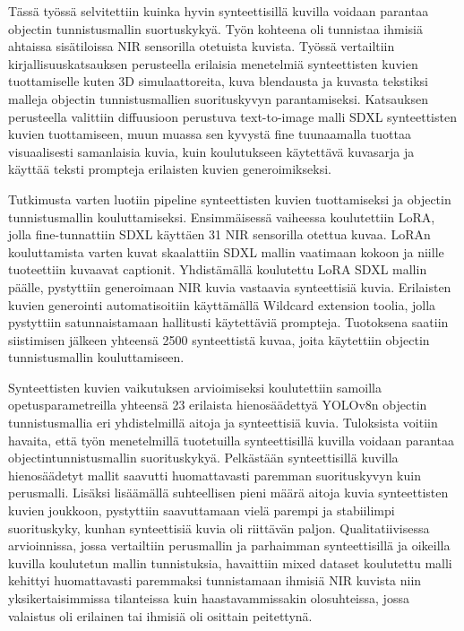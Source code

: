 Tässä työssä selvitettiin kuinka hyvin synteettisillä kuvilla voidaan parantaa objectin tunnistusmallin suortuskykyä. Työn kohteena oli tunnistaa ihmisiä ahtaissa sisätiloissa NIR sensorilla otetuista kuvista. Työssä vertailtiin kirjallisuuskatsauksen perusteella erilaisia menetelmiä synteettisten kuvien tuottamiselle kuten 3D simulaattoreita, kuva blendausta ja kuvasta tekstiksi malleja objectin tunnistusmallien suorituskyvyn parantamiseksi. Katsauksen perusteella valittiin diffuusioon perustuva text-to-image malli SDXL synteettisten kuvien tuottamiseen, muun muassa sen kyvystä fine tuunaamalla tuottaa visuaalisesti samanlaisia kuvia, kuin koulutukseen käytettävä kuvasarja ja käyttää teksti prompteja erilaisten kuvien generoimikseksi. 


Tutkimusta varten luotiin pipeline synteettisten kuvien tuottamiseksi ja objectin tunnistusmallin kouluttamiseksi. Ensimmäisessä vaiheessa koulutettiin LoRA, jolla fine-tunnattiin SDXL käyttäen 31 NIR sensorilla otettua kuvaa. LoRAn kouluttamista varten kuvat skaalattiin SDXL mallin vaatimaan kokoon ja niille tuoteettiin kuvaavat captionit.  Yhdistämällä koulutettu LoRA SDXL mallin päälle, pystyttiin generoimaan NIR kuvia vastaavia synteettisiä kuvia. Erilaisten kuvien generointi automatisoitiin käyttämällä Wildcard extension toolia, jolla pystyttiin satunnaistamaan hallitusti käytettäviä prompteja. Tuotoksena saatiin siistimisen jälkeen yhteensä 2500 synteettistä kuvaa, joita käytettiin objectin tunnistusmallin kouluttamiseen.

Synteettisten kuvien vaikutuksen arvioimiseksi koulutettiin samoilla opetusparametreilla yhteensä 23 erilaista hienosäädettyä YOLOv8n objectin tunnistusmallia eri yhdistelmillä aitoja ja synteettisiä kuvia. Tuloksista voitiin havaita, että työn menetelmillä tuotetuilla synteettisillä kuvilla voidaan parantaa objectintunnistusmallin suorituskykyä. Pelkästään synteettisillä kuvilla hienosäädetyt mallit saavutti huomattavasti paremman suorituskyvyn kuin perusmalli. Lisäksi lisäämällä suhteellisen pieni määrä aitoja kuvia synteettisten kuvien joukkoon, pystyttiin saavuttamaan vielä parempi ja stabiilimpi suorituskyky, kunhan synteettisiä kuvia oli riittävän paljon. Qualitatiivisessa arvioinnissa, jossa vertailtiin perusmallin ja parhaimman synteettisillä ja oikeilla kuvilla koulutetun mallin tunnistuksia, havaittiin mixed dataset koulutettu malli kehittyi huomattavasti paremmaksi tunnistamaan ihmisiä NIR kuvista niin yksikertaisimmissa tilanteissa kuin haastavammissakin olosuhteissa, jossa valaistus oli erilainen tai ihmisiä oli osittain peitettynä.

